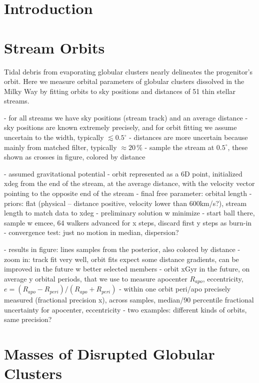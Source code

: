 \documentclass[twocolumn]{aastex63}
\begin{document}
\section{Introduction}
\label{sec:intro}


\section{Stream Orbits}
\label{sec:orbits}
Tidal debris from evaporating globular clusters nearly delineates the progenitor's orbit.
Here we measure orbital parameters of globular clusters dissolved in the Milky Way by fitting orbits to sky positions and distances of 51 thin stellar streams.

- for all streams we have sky positions (stream track) and an average distance
- sky positions are known extremely precisely, and for orbit fitting we assume uncertain to the width, typically $\lesssim0.5^\circ$
- distances are more uncertain because mainly from matched filter, typically $\approx20\,\%$
- sample the stream at $0.5^\circ$, these shown as crosses in figure, colored by distance

- assumed gravitational potential
- orbit represented as a 6D point, initialized xdeg from the end of the stream, at the average distance, with the velocity vector pointing to the opposite end of the stream
- final free parameter: orbital length
- priors: flat (physical -- distance positive, velocity lower than 600km/s?), stream length to match data to xdeg
- preliminary solution w minimize
- start ball there, sample w emcee, 64 walkers advanced for x steps, discard first y steps as burn-in
- convergence test: just no motion in median, dispersion?

- results in figure: lines samples from the posterior, also colored by distance
- zoom in: track fit very well, orbit fits expect some distance gradients, can be improved in the future w better selected members
- orbit xGyr in the future, on average y orbital periods, that we use to measure apocenter $R_{apo}$, eccentricity, $e=(R_{apo} - R_{peri})/(R_{apo} + R_{peri})$
- within one orbit peri/apo precisely measured (fractional precision x), across samples, median/90 percentile fractional uncertainty for apocenter, eccentricity
- two examples: different kinds of orbits, same precision?


\section{Masses of Disrupted Globular Clusters}
\label{sec:disrupted}
\end{document}
